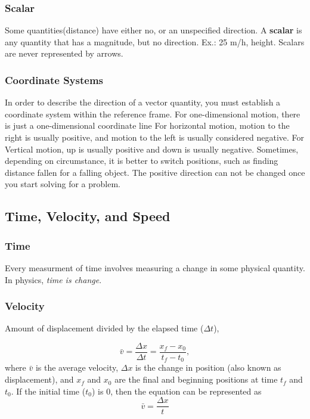 \documentclass{article}
\begin{document}
\subsubsection{Scalar}

Some quantities(distance) have either no, or an unspecified direction.
A \textbf{scalar} is any quantity that has a magnitude, but no direction. Ex.: 25 m/h, height.
Scalars are never represented by arrows.

\subsubsection{Coordinate Systems}
In order to describe the direction of a vector quantity, you must establish a coordinate system within the reference frame.
For one-dimensional motion, there is just a one-dimensional coordinate line
For horizontal motion, motion to the right is usually positive, and motion to the left is usually considered negative.
For Vertical motion, up is usually positive and down is usually negative.
Sometimes, depending on circumstance, it is better to switch positions, such as finding distance fallen for a falling object.
The positive direction can not be changed once you start solving for a problem.

\subsection{Time, Velocity, and Speed}

\subsubsection{Time}

Every measurment of time involves measuring a change in some physical quantity.
In physics, \emph{time is change}.

\subsubsection{Velocity}
Amount of displacement divided by the elapsed time ($\Delta{t}$),

\[\bar{v} = \frac{\Delta{x}}{\Delta{t}} = \frac{x_f - x_0}{t_f - t_0},\]
where $\bar{v}$ is the average velocity, $\Delta{x}$ is the change in position (also known as displacement), and $x_f$ and $x_0$ are the final and beginning positions at time $t_f$ and $t_0$.
If the initial time ($t_0$) is 0, then the equation can be represented as \[\bar{v} = \frac{\Delta{x}}{t}\]
\end{document}
